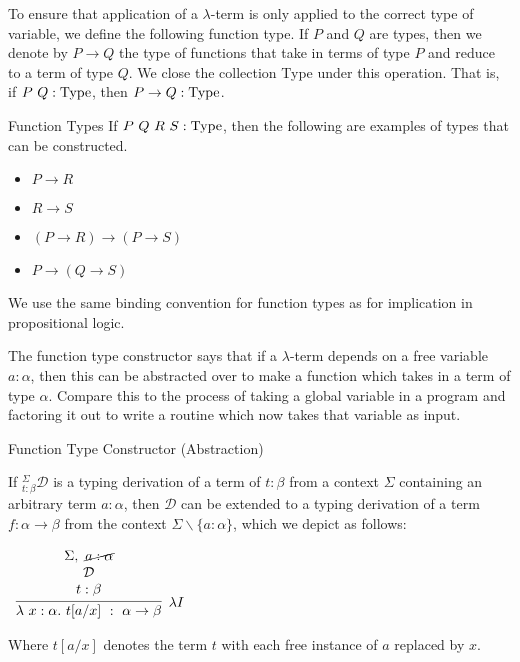 \documentclass{book}
\begin{document}
        To ensure that application of a $\lambda$-term is only applied to the correct type of variable, we define the following function type. If $P$ and $Q$ are types, then we denote by $P \to Q$ the type of functions that take in terms of type $P$ and reduce to a term of type $Q$. We close the collection Type under this operation. That is, if $P \ Q : \text{Type}$, then $P \to Q : \text{Type}$.

        \begin{eg}{Function Types}
            If $P \ Q \ R \ S : \type$, then the following are examples of types that can be constructed. 

                \begin{itemize}
                    \item[] $P \to R$
                    \item[] $R \to S$ 
                    \item[] $(P \to R) \to (P \to S)$
                    \item[] $P \to (Q \to S)$
                \end{itemize}
            
            We use the same binding convention for function types as for implication in propositional logic. 
        \end{eg}

        The function type constructor says that if a $\lambda$-term depends on a free variable $a : \alpha$, then this can be abstracted over to make a function which takes in a term of type $\alpha$. Compare this to the process of taking a global variable in a program and factoring it out to write a routine which now takes that variable as input. 

        \begin{definition}{Function Type Constructor (Abstraction)}
    
            If $^{\Sigma}_{t : \beta}\mathcal{D}$ is a typing derivation of a term of  $t : \beta$ from a context $\Sigma$ containing an arbitrary term $a : \alpha$, then $\mathcal{D}$ can be extended to a typing derivation of a term $f : \alpha \rightarrow \beta$ from the context $\Sigma \backslash \{a : \alpha\}$, which we depict as follows: 
    
            \begin{center}
                $\begin{array}{c}		
                    \infer[\lambda I]{\lambda \ x : \alpha. \ t[a/x] \ : \ \alpha \rightarrow \beta}
                        {\begin{array}{c} \Sigma, \ \cancel{a : \alpha} \\ \mathcal{D} \\ t : \beta \end{array}}
                \end{array}$
            \end{center}

            Where $t[a/x]$ denotes the term $t$ with each free instance of $a$ replaced by $x$. 
        \end{definition}
    
\end{document}
